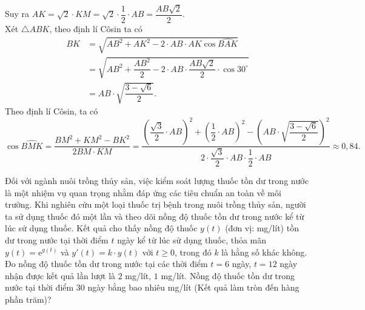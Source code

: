 \begin{ex}
{		Suy ra $AK=\sqrt{2}\cdot KM=\sqrt{2}\cdot\dfrac{1}{2}\cdot AB=\dfrac{AB\sqrt{2}}{2}$.\\
		Xét $\triangle ABK$, theo định lí Côsin ta có
		\begin{align*}
			BK&=\sqrt{AB^2+AK^2-2\cdot AB\cdot AK\cos\widehat{BAK}}\\
			&=\sqrt{AB^2+\dfrac{AB^2}{2}-2\cdot AB\cdot\dfrac{AB\sqrt{2}}{2}\cdot\cos30^{\circ}}\\
			&=AB\cdot\sqrt{\dfrac{3-\sqrt{6}}{2}}. 
		\end{align*}
		Theo định lí Côsin, ta có 
		\[\cos\widehat{BMK}=\dfrac{BM^2+KM^2-BK^2}{2BM\cdot KM}=\dfrac{\left(\dfrac{\sqrt{3}}{2}\cdot AB\right)^2+\left(\dfrac{1}{2}\cdot AB\right)^2-\left(AB\cdot\sqrt{\dfrac{3-\sqrt{6}}{2}}\right)^2}{2\cdot\dfrac{\sqrt{3}}{2}\cdot AB\cdot\dfrac{1}{2}\cdot AB}\approx0{,}84.\]
	}
\end{ex}
\begin{ex}%
	Đối với ngành nuôi trồng thủy sản, việc kiểm soát lượng thuốc tồn dư trong nước là một nhiệm vụ quan trọng nhằm đáp ứng các tiêu chuẩn an toàn về môi trường. Khi nghiên cứu một loại thuốc trị bệnh trong nuôi trồng thủy sản, người ta sử dụng thuốc đó một lần và theo dõi nồng độ thuốc tồn dư trong nước kể từ lúc sử dụng thuốc. Kết quả cho thấy nồng độ thuốc $y(t)$ (đơn vị: mg/lít) tồn dư trong nước tại thời điểm $t$ ngày kể từ lúc sử dụng thuốc, thỏa mãn $y(t) = \mathrm{e}^{g(t)}$ và $y'(t) = k \cdot y(t)$ với $t \geq 0$, trong đó $k$ là hằng số khác không. Đo nồng độ thuốc tồn dư trong nước tại các thời điểm $t=6$ ngày, $t=12$ ngày nhận được kết quả lần lượt là $2$ mg/lít, $1$ mg/lít. Nồng độ thuốc tồn dư trong nước tại thời điểm $30$ ngày bằng bao nhiêu mg/lít (Kết quả làm tròn đến hàng phần trăm)?
\end{ex}

